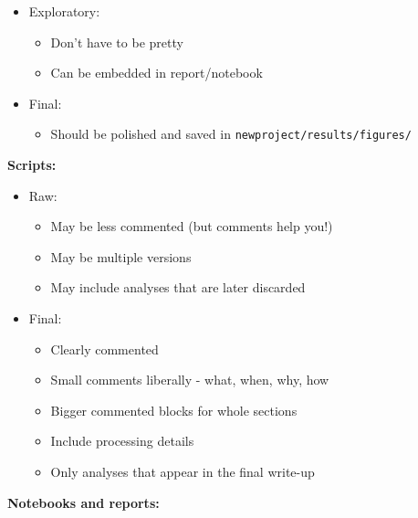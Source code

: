 \documentclass[openany]{article}
\providecommand{\tightlist}{%
  \setlength{\itemsep}{0pt}\setlength{\parskip}{0pt}}
\begin{document}
\begin{itemize}
\tightlist
\item
  Exploratory:

  \begin{itemize}
  \tightlist
  \item
    Don't have to be pretty
  \item
    Can be embedded in report/notebook
  \end{itemize}
\item
  Final:

  \begin{itemize}
  \tightlist
  \item
    Should be polished and saved in \texttt{newproject/results/figures/}
  \end{itemize}
\end{itemize}

\textbf{Scripts:}

\begin{itemize}
\tightlist
\item
  Raw:

  \begin{itemize}
  \tightlist
  \item
    May be less commented (but comments help you!)
  \item
    May be multiple versions
  \item
    May include analyses that are later discarded
  \end{itemize}
\item
  Final:

  \begin{itemize}
  \tightlist
  \item
    Clearly commented
  \item
    Small comments liberally - what, when, why, how
  \item
    Bigger commented blocks for whole sections
  \item
    Include processing details
  \item
    Only analyses that appear in the final write-up
  \end{itemize}
\end{itemize}

\textbf{Notebooks and reports:}
\end{document}
